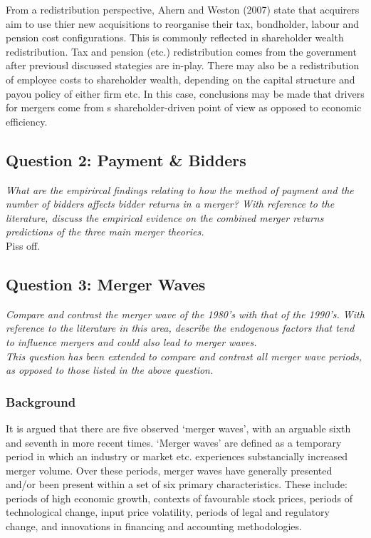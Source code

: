 \documentclass[11pt, english]{article}
\begin{document}
		From a redistribution perspective, Ahern and Weston (2007) state that acquirers aim to use thier new acquisitions to reorganise their tax, bondholder, labour and pension cost configurations. This is commonly reflected in shareholder wealth redistribution. Tax and pension (etc.) redistribution comes from the government after previousl discussed stategies are in-play. There may also be a redistribution of employee costs to shareholder wealth, depending on the capital structure and payou policy of either firm etc. In this case, conclusions may be made that drivers for mergers come from s shareholder-driven point of view as opposed to economic efficiency.

	\newpage 

	\subsection{Question 2: Payment \& Bidders}

	\textit{What are the empirircal findings relating to how the method of payment and the number of bidders affects bidder returns in a merger? With reference to the literature, discuss the empirical evidence on the combined merger returns predictions of the three main merger theories.}\\

	Piss off.

	\newpage

	\subsection{Question 3: Merger Waves}

	\textit{Compare and contrast the merger wave of the 1980's with that of the 1990's. With reference to the literature in this area, describe the endogenous factors that tend to influence mergers and could also lead to merger waves.}\\

	\textit{This question has been extended to compare and contrast all merger wave periods, as opposed to those listed in the above question.}

		\subsubsection*{Background}

	It is argued that there are five observed `merger waves', with an arguable sixth and seventh in more recent times. `Merger waves' are defined as a temporary period in which an industry or market etc. experiences substancially increased merger volume. Over these periods, merger waves have generally presented and/or been present within a set of six primary characteristics. These include: periods of high economic growth, contexts of favourable stock prices, periods of technological change, input price volatility, periods of legal and regulatory change, and innovations in financing and accounting methodologies.
\end{document}
